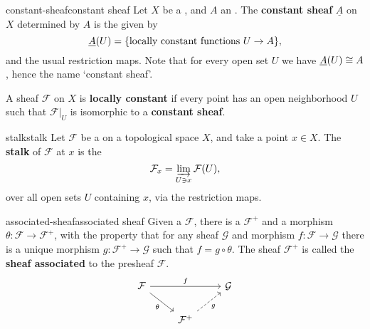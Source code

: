 \begin{topic}{constant-sheaf}{constant sheaf}
    Let $X$ be a , and $A$ an . The \textbf{constant sheaf} $\underline{A}$ on $X$ determined by $A$ is the  given by
    \[ \underline{A}(U) = \{ \textup{locally constant functions } U \to A \} , \]
    and the usual restriction maps. Note that for every  open set $U$ we have $\underline{A}(U) \cong A$, hence the name `constant sheaf'.
    
    A sheaf $\mathcal{F}$ on $X$ is \textbf{locally constant} if every point has an open neighborhood $U$ such that $\mathcal{F}|_U$ is isomorphic to a \textbf{constant sheaf}.
\end{topic}

\begin{topic}{stalk}{stalk}
    Let $\mathcal{F}$ be a  on a topological space $X$, and take a point $x \in X$. The \textbf{stalk} of $\mathcal{F}$ at $x$ is the 
    \[ \mathcal{F}_x = \varinjlim_{U \ni x} \mathcal{F}(U) , \]
    over all open sets $U$ containing $x$, via the restriction maps.
\end{topic}

\begin{topic}{associated-sheaf}{associated sheaf}
    Given a  $\mathcal{F}$, there is a  $\mathcal{F}^+$ and a morphism $\theta : \mathcal{F} \to \mathcal{F}^+$, with the property that for any sheaf $\mathcal{G}$ and morphism $f : \mathcal{F} \to \mathcal{G}$ there is a unique morphism $g : \mathcal{F}^+ \to \mathcal{G}$ such that $f = g \circ \theta$. The sheaf $\mathcal{F}^+$ is called the \textbf{sheaf associated} to the presheaf $\mathcal{F}$.
    \[ \begin{tikzcd} \mathcal{F} \arrow{rr}{f} \arrow[swap]{dr}{\theta} && \mathcal{G} \\ & \mathcal{F}^+ \arrow[swap,dashed]{ur}{g} & \end{tikzcd} \]
\end{topic}


